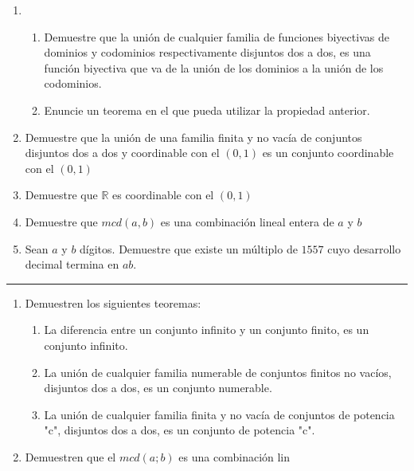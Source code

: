 \documentclass[9pt,a4paper]{extarticle}
\begin{document}
\begin{enumerate}
    \item 
    \begin{enumerate}
        \item Demuestre que la unión de cualquier familia de funciones biyectivas de dominios y codominios respectivamente disjuntos dos a dos, es una función biyectiva que va de la unión de los dominios a la unión de los codominios.
        \item Enuncie un teorema en el que pueda utilizar la propiedad anterior.
    \end{enumerate}
    
    
    
        \item Demuestre que la unión de una familia finita y no vacía de conjuntos disjuntos dos a dos y coordinable con el $(0,1)$ es un conjunto coordinable con el $(0,1)$


    
    \item Demuestre que $\mathbb{R}$ es coordinable con el $(0,1)$
    
    \item Demuestre que $mcd(a,b)$ es una combinación lineal entera de $a$ y $b$
    
        \item Sean $a$ y $b$ dígitos. Demuestre que existe un múltiplo de $1557$ cuyo desarrollo decimal termina en $ab$.
    
    
\end{enumerate}
\hrule

\begin{enumerate}
    \item Demuestren los siguientes teoremas:
    \begin{enumerate}
        \item La diferencia entre un conjunto infinito y un conjunto finito, es un conjunto infinito.
        \item La unión de cualquier familia numerable de conjuntos finitos no vacíos, disjuntos dos a dos, es un conjunto numerable.
        \item La unión de cualquier familia finita y no vacía de conjuntos de potencia "c", disjuntos dos a dos, es un conjunto de potencia "c".
    \end{enumerate}
    
    \item Demuestren que el $mcd(a;b)$ es una combinación lin
\end{enumerate}
\end{document}
